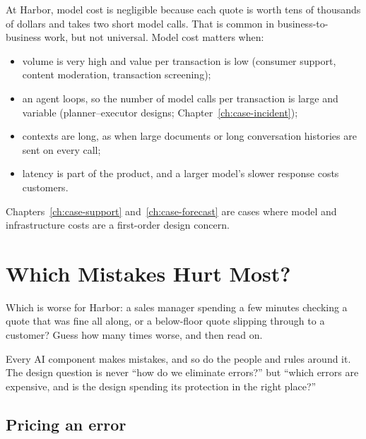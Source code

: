 At Harbor, model cost is negligible because each quote is worth tens of thousands of dollars and takes two short model calls. That is common in business-to-business work, but not universal. Model cost matters when:
\begin{itemize}[itemsep=1pt]
  \item volume is very high and value per transaction is low (consumer support, content moderation, transaction screening);
  \item an agent loops, so the number of model calls per transaction is large and variable (planner--executor designs; Chapter~\ref{ch:case-incident});
  \item contexts are long, as when large documents or long conversation histories are sent on every call;
  \item latency is part of the product, and a larger model's slower response costs customers.
\end{itemize}
Chapters~\ref{ch:case-support} and~\ref{ch:case-forecast} are cases where model and infrastructure costs are a first-order design concern.

\section{Which Mistakes Hurt Most?}
\label{sec:error-cost}

\begin{thinkabout}
Which is worse for Harbor: a sales manager spending a few minutes checking a quote that was fine all along, or a below-floor quote slipping through to a customer? Guess how many times worse, and then read on.
\end{thinkabout}

Every AI component makes mistakes, and so do the people and rules around it. The design question is never ``how do we eliminate errors?'' but ``which errors are expensive, and is the design spending its protection in the right place?''

\subsection{Pricing an error}

